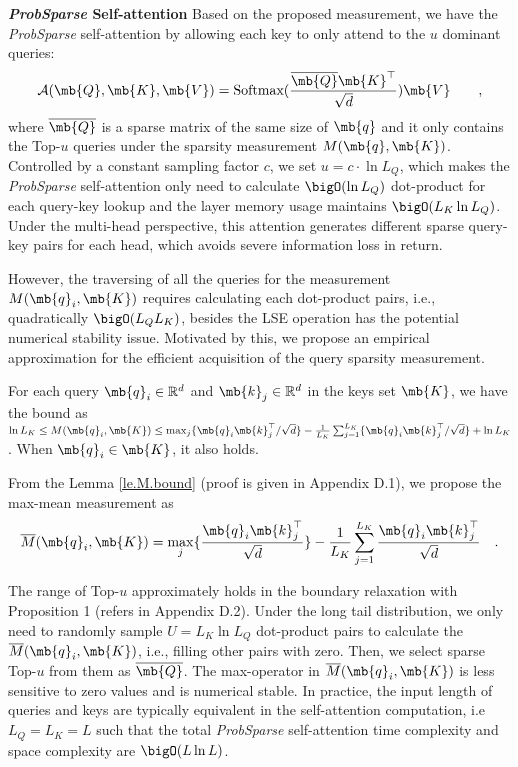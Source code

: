 \textbf{\emph{ProbSparse} Self-attention}
Based on the proposed measurement, we have the \emph{ProbSparse} self-attention by allowing each key to only attend to the $u$ dominant queries:
\begin{equation}
\label{eq:method.probsparse}
    \mathcal{A} (\mb{Q}, \mb{K}, \mb{V}) = \textrm{Softmax} (\frac{\overline{\mb{Q}}\mb{K}^{\top}}{\sqrt{d}})\mb{V} \qquad,
\end{equation}
where $\overline{\mb{Q}}$ is a sparse matrix of the same size of $\mb{q}$ and it only contains the Top-$u$ queries under the sparsity measurement $M(\mb{q},\mb{K})$. Controlled by a constant sampling factor $c$, we set $u=c \cdot \ln{L_Q}$, which makes the \emph{ProbSparse} self-attention only need to calculate $\bigO(\ln{L_Q})$ dot-product for each query-key lookup and the layer memory usage maintains $\bigO(L_K\ln{L_Q})$. Under the multi-head perspective, this attention generates different sparse query-key pairs for each head, which avoids severe information loss in return.

However, the traversing of all the queries for the measurement $M(\mb{q}_i,\mb{K})$ requires calculating each dot-product pairs, i.e., quadratically $\bigO(L_Q L_K)$, besides the LSE operation has the potential numerical stability issue. Motivated by this, we propose an empirical approximation for the efficient acquisition of the query sparsity measurement.

\begin{lemma}
\label{le.M.bound}
For each query $\mb{q}_i \in \mathbb{R}^{d}$ and $\mb{k}_j \in \mathbb{R}^{d}$ in the keys set $\mb{K}$, we have the bound as
$\ln L_K \leq M (\mb{q}_i, \mb{K}) \leq \max_{j}\{{\mb{q}_i \mb{k}_j^{\top}}/{\sqrt{d}}\} - \frac{1}{L_K} \sum_{j=1}^{L_K} \{{\mb{q}_i\mb{k}_j^{\top}}/{\sqrt{d}} \} + \ln L_K$.
When $\mb{q}_i \in \mb{K}$, it also holds.
\end{lemma}

From the Lemma \ref{le.M.bound} (proof is given in Appendix D.1), we propose the max-mean measurement as
\begin{equation}
\label{eq.method.measure2}
    \overline{M} (\mb{q}_i, \mb{K}) = \max_{j}\{\frac{\mb{q}_i \mb{k}_j^{\top}}{\sqrt{d}}\} - \frac{1}{L_K} \sum_{j=1}^{L_K} \frac{\mb{q}_i\mb{k}_j^{\top}}{\sqrt{d}} \quad.
\end{equation}

The range of Top-$u$ approximately holds in the boundary relaxation with Proposition 1 (refers in Appendix D.2). Under the long tail distribution, we only need to randomly sample $U=L_K \ln L_Q$ dot-product pairs to calculate the $\overline{M} (\mb{q}_i, \mb{K})$, i.e., filling other pairs with zero. Then, we select sparse Top-$u$ from them as $\overline{\mb{Q}}$. The max-operator in $\overline{M} (\mb{q}_i, \mb{K})$ is less sensitive to zero values and is numerical stable. In practice, the input length of queries and keys are typically equivalent in the self-attention computation, i.e $L_Q=L_K=L$ such that the total \emph{ProbSparse} self-attention time complexity and space complexity are $\bigO(L \ln L)$.

